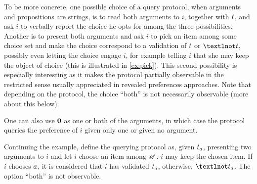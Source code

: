 \documentclass[version=last, pagesize, twoside=off, bibliography=totoc, DIV=calc, fontsize=12pt, a4paper, french, english]{scrartcl}
\begin{document}
To be more concrete, one possible choice of a query protocol, when arguments and propositions are strings, is to read both arguments to $i$, together with $t$, and ask $i$ to verbally report the choice he opts for among the three possibilities. Another is to present both arguments and ask $i$ to pick an item among some choice set and make the choice correspond to a validation of $t$ or $¬\prop$, possibly even letting the choice engage $i$, for example telling $i$ that she may keep the object of choice (this is illustrated in \cref{ex:pick}). This second possibility is especially interesting as it makes the protocol partially observable in the restricted sense usually appreciated in revealed preferences approaches. Note that depending on the protocol, the choice “both” is not necessarily observable (more about this below).

One can also use $\mathbf{0}$ as one or both of the arguments, in which case the protocol queries the preference of $i$ given only one or given no argument.

\begin{example}[cont.]
	\label{ex:pick}
	Continuing the example, define the querying protocol as, given $t_a$, presenting two arguments to $i$ and let $i$ choose an item among $\mathscr{A}$. $i$ may keep the chosen item. 
	If $i$ chooses $a$, it is considered that $i$ has validated $t_a$, otherwise, $¬\prop_\alt$. The option “both” is not observable.
\end{example}
\end{document}
